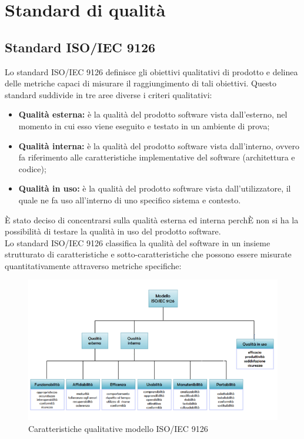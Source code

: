 \section{Standard di qualità}\label{section:standard-qualita}

\subsection{Standard ISO/IEC 9126} \label{subsection:9126}
Lo standard ISO/IEC 9126 definisce gli obiettivi qualitativi di prodotto e delinea delle metriche capaci di misurare il raggiungimento di tali obiettivi. Questo standard suddivide in tre aree diverse i criteri qualitativi:
\begin{itemize}
	\item \textbf{Qualità esterna:} è la qualità del prodotto software vista dall'esterno, nel momento in cui esso viene eseguito e testato in un ambiente di prova;
	\item \textbf{Qualità interna:} è la qualità del prodotto software vista dall'interno, ovvero fa riferimento alle caratteristiche implementative del software (architettura e codice);
	\item \textbf{Qualità in uso:} è la qualità del prodotto software vista dall'utilizzatore, il quale ne fa uso all'interno di uno specifico sistema e contesto.
\end{itemize}
È stato deciso di concentrarsi sulla qualità esterna ed interna perchÈ non si ha la possibilità di testare la qualità in uso del prodotto software.\\
Lo standard ISO/IEC 9126 classifica la qualità del software in un insieme strutturato di caratteristiche e sotto-caratteristiche che possono essere misurate quantitativamente attraverso metriche specifiche:
\begin{figure}[H]
	\centering
	\includegraphics[scale=0.82]{immagini/ISO-IEC_9126.png}
	\caption{Caratteristiche qualitative modello ISO/IEC 9126}
\end{figure}


